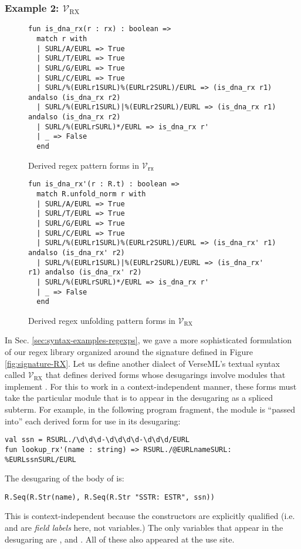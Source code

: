 {\subsubsection{Example 2: $\mathcal{V}_\text{RX}$}
\begin{figure}
\begin{lstlisting}[numbers=none]
fun is_dna_rx(r : rx) : boolean => 
  match r with 
  | SURL/A/EURL => True
  | SURL/T/EURL => True
  | SURL/G/EURL => True
  | SURL/C/EURL => True
  | SURL/%(EURLr1SURL)%(EURLr2SURL)/EURL => (is_dna_rx r1) andalso (is_dna_rx r2)
  | SURL/%(EURLr1SURL)|%(EURLr2SURL)/EURL => (is_dna_rx r1) andalso (is_dna_rx r2)
  | SURL/%(EURLrSURL)*/EURL => is_dna_rx r'
  | _ => False
  end
\end{lstlisting}
\vspace{-5px}
\caption{Derived regex pattern forms in $\mathcal{V}_\texttt{rx}$}
\label{fig:derived-pattern-syntax}
\end{figure}
\begin{figure}
\begin{lstlisting}[numbers=none]
fun is_dna_rx'(r : R.t) : boolean => 
  match R.unfold_norm r with 
  | SURL/A/EURL => True
  | SURL/T/EURL => True
  | SURL/G/EURL => True
  | SURL/C/EURL => True
  | SURL/%(EURLr1SURL)%(EURLr2SURL)/EURL => (is_dna_rx' r1) andalso (is_dna_rx' r2)
  | SURL/%(EURLr1SURL)|%(EURLr2SURL)/EURL => (is_dna_rx' r1) andalso (is_dna_rx' r2)
  | SURL/%(EURLrSURL)*/EURL => is_dna_rx r'
  | _ => False
  end
\end{lstlisting}\vspace{-5px}
\caption{Derived regex unfolding pattern forms in $\mathcal{V}_\text{RX}$}
\label{fig:VRX-pats}
\end{figure}

In Sec. \ref{sec:syntax-examples-regexps}, we gave a more sophisticated formulation of our regex library organized around the signature  defined in Figure \ref{fig:signature-RX}. Let us define another dialect of VerseML's textual syntax called $\mathcal{V}_\text{RX}$ that defines derived forms whose desugarings involve modules that implement . For this to work in a  context-independent manner, these forms must take the particular module that is to appear in the desugaring as a spliced subterm. For example, in the following program fragment, the module  is ``passed into'' each derived form for use in its desugaring:
\begin{lstlisting}[numbers=none]
val ssn = RSURL./\d\d\d-\d\d\d\d-\d\d\d/EURL
fun lookup_rx'(name : string) => RSURL./@EURLnameSURL: %EURLssnSURL/EURL
\end{lstlisting}
The desugaring of the body of  is:
\begin{lstlisting}[numbers=none]
R.Seq(R.Str(name), R.Seq(R.Str "SSTR: ESTR", ssn))
\end{lstlisting}
This is context-independent because the constructors are explicitly qualified (i.e.  and  are \emph{field labels} here, not variables.) The only variables that appear in the desugaring are ,  and . All of these also appeared at the use site.

}
